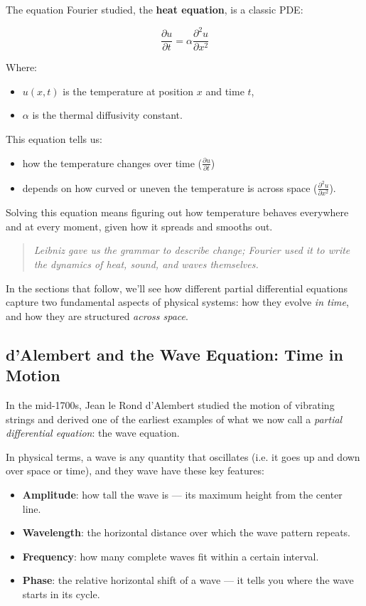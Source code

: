 The equation Fourier studied, the \textbf{heat equation}, is a classic PDE:

\[
\frac{\partial u}{\partial t} = \alpha \frac{\partial^2 u}{\partial x^2}
\]

Where:
\begin{itemize}
  \item \( u(x, t) \) is the temperature at position \( x \) and time \( t \),
  \item \( \alpha \) is the thermal diffusivity constant.
\end{itemize}

This equation tells us:  
\begin{itemize}
  \item how the temperature changes over time (\( \frac{\partial u}{\partial t} \))  
  \item depends on how curved or uneven the temperature is across space (\( \frac{\partial^2 u}{\partial x^2} \)).  
\end{itemize}

Solving this equation means figuring out how temperature behaves everywhere and at every moment, given how it spreads and smooths out.

\begin{quote}
\textit{Leibniz gave us the grammar to describe change; Fourier used it to write the dynamics of heat, sound, and waves themselves.}
\end{quote}

In the sections that follow, we’ll see how different partial differential equations capture two fundamental aspects of physical systems: how they evolve \emph{in time}, and how they are structured \emph{across space}.



\subsection{d’Alembert and the Wave Equation: Time in Motion}

In the mid-1700s, Jean le Rond d’Alembert studied the motion of vibrating strings and derived one of the earliest examples of what we now call a \textit{partial differential equation}: the wave equation.

In physical terms, a wave is any quantity that oscillates (i.e. it goes up and down over space or time), and they wave have these key features:

\begin{itemize}
  \item \textbf{Amplitude}: how tall the wave is — its maximum height from the center line.
  \item \textbf{Wavelength}: the horizontal distance over which the wave pattern repeats.
  \item \textbf{Frequency}: how many complete waves fit within a certain interval.
  \item \textbf{Phase}: the relative horizontal shift of a wave — it tells you where the wave starts in its cycle.
\end{itemize}


